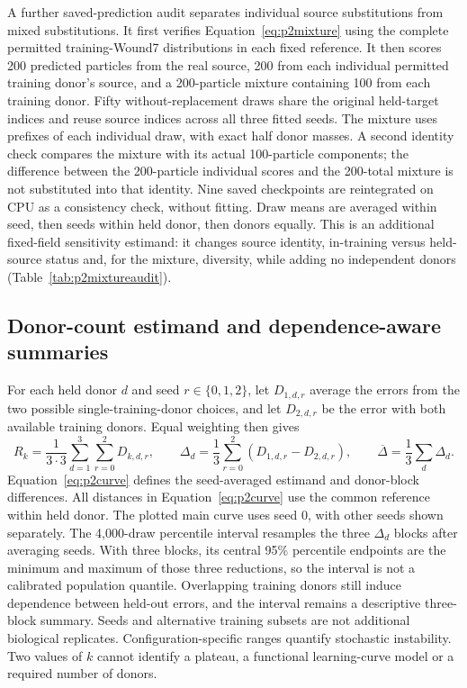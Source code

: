 \documentclass[10pt,a4paper]{article}
\begin{document}
A further saved-prediction audit separates individual source substitutions from mixed substitutions. It first verifies Equation~\eqref{eq:p2mixture} using the complete permitted training-Wound7 distributions in each fixed reference. It then scores 200 predicted particles from the real source, 200 from each individual permitted training donor's source, and a 200-particle mixture containing 100 from each training donor. Fifty without-replacement draws share the original held-target indices and reuse source indices across all three fitted seeds. The mixture uses prefixes of each individual draw, with exact half donor masses. A second identity check compares the mixture with its actual 100-particle components; the difference between the 200-particle individual scores and the 200-total mixture is not substituted into that identity. Nine saved checkpoints are reintegrated on CPU as a consistency check, without fitting. Draw means are averaged within seed, then seeds within held donor, then donors equally. This is an additional fixed-field sensitivity estimand: it changes source identity, in-training versus held-source status and, for the mixture, diversity, while adding no independent donors (Table~\ref{tab:p2mixtureaudit}).

\subsection{Donor-count estimand and dependence-aware summaries}
For each held donor $d$ and seed $r\in\{0,1,2\}$, let $D_{1,d,r}$ average the errors from the two possible single-training-donor choices, and let $D_{2,d,r}$ be the error with both available training donors. Equal weighting then gives
\begin{equation}
R_k=\frac1{3\cdot3}\sum_{d=1}^{3}\sum_{r=0}^{2}D_{k,d,r},\qquad
\Delta_d=\frac13\sum_{r=0}^{2}(D_{1,d,r}-D_{2,d,r}),\qquad
\overline\Delta=\frac13\sum_d\Delta_d.\label{eq:p2curve}
\end{equation}
Equation~\eqref{eq:p2curve} defines the seed-averaged estimand and donor-block differences. All distances in Equation~\eqref{eq:p2curve} use the common reference within held donor. The plotted main curve uses seed 0, with other seeds shown separately. The 4,000-draw percentile interval resamples the three $\Delta_d$ blocks after averaging seeds. With three blocks, its central 95\% percentile endpoints are the minimum and maximum of those three reductions, so the interval is not a calibrated population quantile. Overlapping training donors still induce dependence between held-out errors, and the interval remains a descriptive three-block summary. Seeds and alternative training subsets are not additional biological replicates. Configuration-specific ranges quantify stochastic instability. Two values of $k$ cannot identify a plateau, a functional learning-curve model or a required number of donors.
\end{document}
